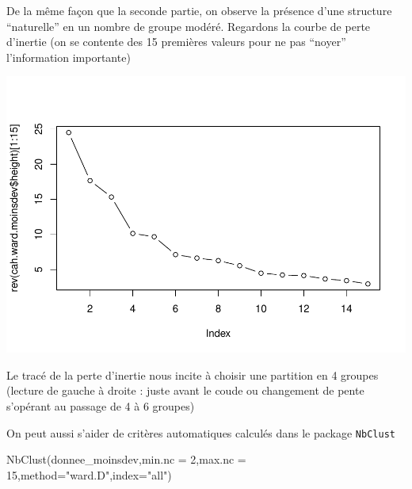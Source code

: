 \documentclass[
]{article}
\newenvironment{Shaded}{}{}
\newcommand{\AttributeTok}[1]{#1}
\newcommand{\DecValTok}[1]{#1}
\newcommand{\FunctionTok}[1]{#1}
\newcommand{\NormalTok}[1]{#1}
\newcommand{\SpecialCharTok}[1]{\textcolor[rgb]{0.00,0.50,0.50}{#1}}
\newcommand{\StringTok}[1]{\textcolor[rgb]{0.00,0.50,0.50}{#1}}
\begin{document}
De la même façon que la seconde partie, on observe la présence d'une
structure ``naturelle'' en un nombre de groupe modéré. Regardons la
courbe de perte d'inertie (on se contente des 15 premières valeurs pour
ne pas ``noyer'' l'information importante)

\begin{Shaded}
\end{Shaded}

\includegraphics{Projet_files/figure-latex/unnamed-chunk-32-1.pdf}

Le tracé de la perte d'inertie nous incite à choisir une partition en 4
groupes (lecture de gauche à droite : juste avant le coude ou changement
de pente s'opérant au passage de 4 à 6 groupes)

On peut aussi s'aider de critères automatiques calculés dans le package
\texttt{NbClust}

\begin{Shaded}
\begin{Highlighting}[]
\FunctionTok{NbClust}\NormalTok{(donnee\_moinsdev,}\AttributeTok{min.nc =} \DecValTok{2}\NormalTok{,}\AttributeTok{max.nc =} \DecValTok{15}\NormalTok{,}\AttributeTok{method=}\StringTok{"ward.D"}\NormalTok{,}\AttributeTok{index=}\StringTok{"all"}\NormalTok{)}
\end{Highlighting}
\end{Shaded}
\end{document}
